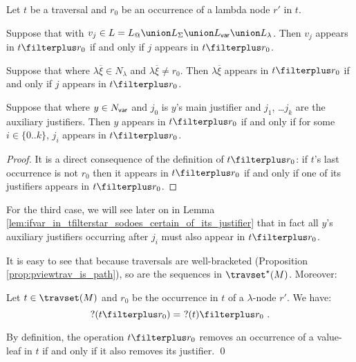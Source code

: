 \begin{lemma}
\label{lem:ifin_tfilterstar_so_does_justifier}
Let $t$ be a traversal
and  $r_0$ be an occurrence of a lambda node $r'$ in $t$.
\begin{compactitem}
  \item Suppose that  with $v_j \in L = L_@ \union L_\Sigma \union L_{\sf var} \union L_\lambda$.
      Then $v_j$ appears in $t\filterplus r_0$ if and only if
      $j$ appears in $t\filterplus r_0$.
  \item Suppose that  where $\lambda \overline{\xi} \in N_\lambda$
          and $\lambda \overline{\xi} \neq r_0$.
          Then $\lambda \overline{\xi}$ appears in $t\filterplus r_0$ if and only if $j$ appears in $t\filterplus r_0$.

  \item Suppose that  where $y\in N_{\sf var}$ and $j_0$ is $y$'s main justifier
    and $j_1$, \ldots $j_k$ are the auxiliary justifiers.
    Then $y$ appears in $t\filterplus r_0$ if and only if
      for some $i \in \{0..k\}$, $j_i$ appears in $t\filterplus r_0$.
\end{compactitem}
\end{lemma}
\begin{proof}
  It is a direct consequence of the definition of $t\filterplus r_0$: if $t$'s last occurrence is not $r_0$ then it appears in
  $t\filterplus r_0$ if and only if one of its justifiers appears in $t\filterplus r_0$.
\end{proof}
For the third case, we will see later on in Lemma
\ref{lem:ifvar_in_tfilterstar_sodoes_certain_of_its_justifier} that
in fact all $y$'s auxiliary justifiers occurring after $j_i$ must
also appear in $t\filterplus r_0$.


It is easy to see that because traversals are well-bracketed (Proposition \ref{prop:pviewtrav_is_path}), so are the sequences in $\travset^\star(M)$. Moreover:
\begin{lemma}
\label{lem:filterplus_pendingnode}
 Let $t \in \travset(M)$ and $r_0$ be the occurrence in $t$ of a $\lambda$-node $r'$.
 We have:
  $$?(t\filterplus r_0) =\ ?(t) \filterplus r_0 \ .$$
\end{lemma}
\proof
 By definition, the operation $t \filterplus r_0$ removes an occurrence of a value-leaf in $t$
if and only if it also removes its justifier. \qed


